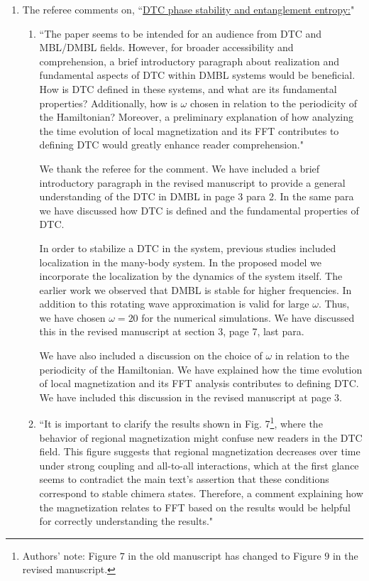 \documentclass[aps,prb,reprint,showpacs,floatfix,superscriptaddress, onecolumn, nofootinbib, 10pt]{revtex4-2}
\newcommand{\response}[1]{{\color{black}#1}} %
\newcommand{\comment}[1]{{\color{blue}#1}} %
\begin{document}
\begin{enumerate}
\begin{enumerate}
		\item The referee comments on, \comment{``\underline{DTC phase stability and entanglement entropy:}"}
		\begin{enumerate}
			\item \comment{``The paper seems to be intended for an audience from DTC and MBL/DMBL fields. However, for broader accessibility and comprehension, a brief introductory paragraph about realization and fundamental aspects of DTC within DMBL
			systems would be beneficial. How is DTC defined in these systems, and what are its fundamental properties? Additionally, how is $\omega$ chosen in relation to the periodicity of the Hamiltonian? Moreover, a preliminary explanation of how analyzing the time evolution of local magnetization and its FFT contributes to defining DTC would greatly enhance reader comprehension."}\\
			
			\response{ 
			We thank the referee for the comment. We have included a brief introductory paragraph in the revised manuscript to provide a general understanding of the DTC in DMBL in page 3 para 2. In the same para we have discussed how DTC is defined and the fundamental properties of DTC.

			In order to stabilize a DTC in the system, previous studies included localization in the many-body system. In the proposed model we incorporate the localization by the dynamics of the system itself. The earlier work we observed that DMBL is stable for higher frequencies. In addition to this rotating wave approximation is valid for large $\omega$. Thus, we have chosen $\omega=20$ for the numerical simulations. We have discussed this in the revised manuscript at section 3, page 7, last para.


			We have also included a discussion on the choice of $\omega$ in relation to the periodicity of the Hamiltonian. We have explained how the time evolution of local magnetization and its FFT analysis contributes to defining DTC. We have included this discussion in the revised manuscript at page 3.
			}

			\item \comment{``It is important to clarify the results shown in Fig. 7\footnote{Authors' note: Figure $7$ in the old manuscript has changed to Figure $9$ in the revised manuscript.}, where the behavior of regional magnetization might confuse new readers in the DTC field. This figure suggests that regional magnetization decreases over time under strong coupling and all-to-all interactions, which at the first glance seems to contradict the main text’s assertion that these conditions correspond to stable chimera states. Therefore, a comment  explaining how the magnetization relates to FFT based on the results would be helpful for correctly understanding the results."}\\
			

\end{enumerate}
\end{enumerate}
\end{enumerate}
\end{document}
